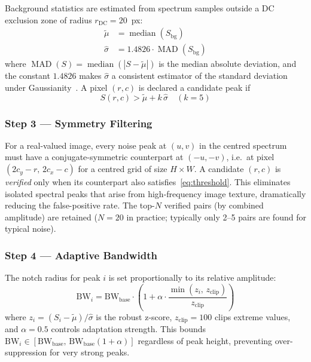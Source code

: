 \documentclass[conference,a4paper]{IEEEtran}
\begin{document}
Background statistics are estimated from spectrum samples outside a DC exclusion zone of radius $r_\text{DC}=20$~px:
\begin{align}
  \tilde{\mu}  &= \operatorname{median}(S_\text{bg}) \label{eq:mu}\\
  \hat{\sigma} &= 1.4826 \cdot \operatorname{MAD}(S_\text{bg}) \label{eq:sigma}
\end{align}
where $\operatorname{MAD}(S)=\operatorname{median}(|S-\tilde\mu|)$ is the median absolute deviation, and the constant $1.4826$ makes $\hat\sigma$ a consistent estimator of the standard deviation under Gaussianity~\cite{rousseeuw1993}. A pixel $(r,c)$ is declared a candidate peak if
\begin{equation}
  S(r,c) > \tilde{\mu} + k\,\hat{\sigma} \quad (k=5)
  \label{eq:threshold}
\end{equation}

\subsubsection{Step 3 — Symmetry Filtering}

For a real-valued image, every noise peak at $(u,v)$ in the centred spectrum must have a conjugate-symmetric counterpart at $(-u,-v)$, i.e.\ at pixel $(2c_y-r,\,2c_x-c)$ for a centred grid of size $H\times W$. A candidate $(r,c)$ is \emph{verified} only when its counterpart also satisfies~\eqref{eq:threshold}. This eliminates isolated spectral peaks that arise from high-frequency image texture, dramatically reducing the false-positive rate. The top-$N$ verified pairs (by combined amplitude) are retained ($N=20$ in practice; typically only 2--5 pairs are found for typical noise).

\subsubsection{Step 4 — Adaptive Bandwidth}

The notch radius for peak $i$ is set proportionally to its relative amplitude:
\begin{equation}
  \mathrm{BW}_i = \mathrm{BW}_\text{base} \cdot \left(1 + \alpha \cdot \frac{\min(z_i,\,z_\text{clip})}{z_\text{clip}}\right)
  \label{eq:bw}
\end{equation}
where $z_i = (S_i - \tilde\mu)/\hat\sigma$ is the robust z-score, $z_\text{clip}=100$ clips extreme values, and $\alpha=0.5$ controls adaptation strength. This bounds $\mathrm{BW}_i \in [\mathrm{BW}_\text{base},\,\mathrm{BW}_\text{base}(1+\alpha)]$ regardless of peak height, preventing over-suppression for very strong peaks.
\end{document}
